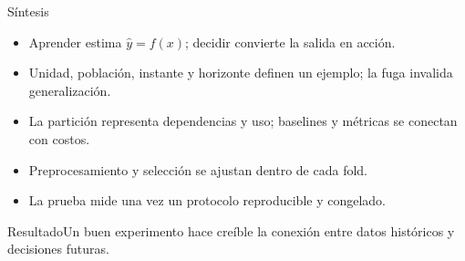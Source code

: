 \documentclass[aspectratio=169,10pt]{beamer}
\begin{document}
\begin{frame}{Síntesis}
  \small
  \begin{center}\end{center}
  \begin{itemize}
    \item Aprender estima $\hat y=f(x)$; decidir convierte la salida en acción.
    \item Unidad, población, instante y horizonte definen un ejemplo; la fuga invalida generalización.
    \item La partición representa dependencias y uso; baselines y métricas se conectan con costos.
    \item Preprocesamiento y selección se ajustan dentro de cada fold.
    \item La prueba mide una vez un protocolo reproducible y congelado.
  \end{itemize}
  \begin{block}{Resultado}Un buen experimento hace creíble la conexión entre datos históricos y decisiones futuras.\end{block}
\end{frame}
\end{document}
